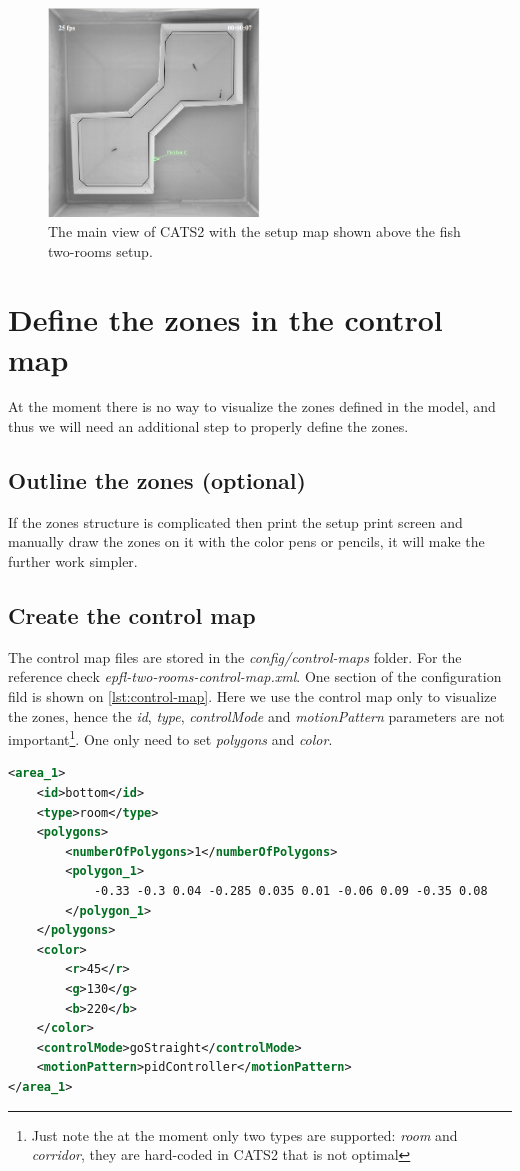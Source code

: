 \documentclass{styles/assisi}
\begin{document}
\begin{figure}[ht]
\centering
\includegraphics[width=0.5\textwidth]{./figs/setup-map.png}
\caption{The main view of CATS2 with the setup map shown above the fish two-rooms setup.}
\label{fig:setup-map}
\end{figure}

\section{Define the zones in the control map}
At the moment there is no way to visualize the zones defined in the model, and thus we will need an additional step to properly define the zones. 

\subsection{Outline the zones (optional)}
If the zones structure is complicated then print the setup print screen and manually draw the zones on it with the color pens or pencils, it will make the further work simpler.

\subsection{Create the control map}
The control map files are stored in the {\it config/control-maps} folder. For the reference check {\it epfl-two-rooms-control-map.xml}. One section of the configuration fild is shown on \ref{lst:control-map}. Here we use the control map only to visualize the zones, hence the {\it id}, {\it type}, {\it controlMode} and {\it motionPattern} parameters are not important\footnote{Just note the at the moment only two types are supported: {\it room} and {\it corridor}, they are hard-coded in CATS2 that is not optimal}. One only need to set {\it polygons} and {\it color}.

\begin{lstlisting}[caption={Control map area example},label={lst:control-map},language=xml]
<area_1>
    <id>bottom</id>
    <type>room</type>
    <polygons>
        <numberOfPolygons>1</numberOfPolygons>
        <polygon_1>
            -0.33 -0.3 0.04 -0.285 0.035 0.01 -0.06 0.09 -0.35 0.08
        </polygon_1>
    </polygons>
    <color>
        <r>45</r>
        <g>130</g>
        <b>220</b>
    </color>
    <controlMode>goStraight</controlMode>
    <motionPattern>pidController</motionPattern>
</area_1>
\end{lstlisting}
\end{document}

